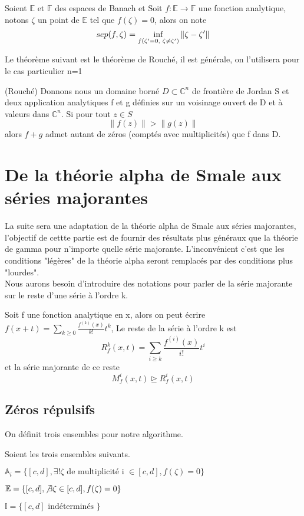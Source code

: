 \documentclass[a4paper,10.5pt]{article}
\begin{document}
	\begin{definition} Soient $\mathbb{E}$ et $\mathbb{F}$ des espaces de Banach et 
		Soit $f:\mathbb{E}\rightarrow \mathbb{F}$ une fonction analytique, notons $\zeta$ un point de $\mathbb{E}$ tel que $f(\zeta)=0$, alors on note
		\begin{equation}
		 sep(f,\zeta)=\inf_{f(\zeta '=0, \hspace{1mm} \zeta \neq \zeta ')}\left\|\zeta-\zeta '\right\|
		\end{equation}
		
	\end{definition}
	
	Le théorème suivant est le théorème de Rouché, il est générale, on l'utilisera pour le cas particulier n=1

	\begin{theorem}(Rouché) Donnons nous un domaine borné $D \subset \mathbb{C}^{n}$ de frontière de Jordan S et deux application analytiques f et g définies sur un voisinage ouvert de D et à valeurs dans $\mathbb{C}^n$. Si pour tout $z \in S$ 
		\[\left\|f(z)\right\|>\left\|g(z)\right\|\]
	alors $f+g$ admet autant de zéros (comptés avec multiplicités) que f dans D.
	\end{theorem}
	
	
	\section{De la théorie alpha de Smale aux séries majorantes}
	
	La suite sera une adaptation de la théorie alpha de Smale aux séries majorantes, l'objectif de cettte partie est de fournir des résultats plus généraux que la théorie de gamma pour n'importe quelle série majorante. L'inconvénient c'est que les conditions "légères" de la théorie alpha seront remplacés par des conditions plus "lourdes". \\
	Nous aurons besoin d'introduire des notations pour parler de la série majorante sur le reste d'une série à l'ordre k.
	
	\begin{definition} Soit f une fonction analytique en x, alors on peut écrire $f(x+t)=\sum_{k \geq 0} \frac{f^{(k)}(x)}{k!}t^{k}$, Le reste de la série à l'ordre k est 
	\[R_{f}^{k}(x,t)=\sum_{i \geq k} \frac{f^{(i)}(x)}{i!}t^{i}\]
	et la série majorante de ce reste
	\[M_{f}^{i}(x,t) \unrhd R_{f}^{i}(x,t)\]
	\end{definition}
	
	\subsection{Zéros répulsifs}
	On définit trois ensembles pour notre algorithme.
	\begin{definition} Soient les trois ensembles suivants.
		
	$\mathbb{A}_i=\{[c,d], \exists ! \zeta \text{ de multiplicité i } \in [c,d], f(\zeta)=0\}$
	
	$\mathbb{E}=\{[c,d], \not\exists \zeta \in [c,d], f(\zeta)=0\}$
	
	$\mathbb{I}=\{[c,d] \text{ indéterminés }\}$\\
	\end{definition}
\end{document}
